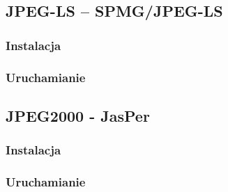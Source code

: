 \subsection{JPEG-LS -- SPMG/JPEG-LS}

\subsubsection{Instalacja}

\subsubsection{Uruchamianie}

\subsection{JPEG2000 - JasPer}

\subsubsection{Instalacja}

\subsubsection{Uruchamianie}